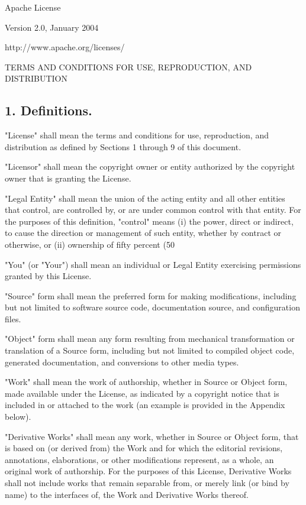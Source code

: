 Apache License

Version 2.0, January 2004

http://www.apache.org/licenses/

TERMS AND CONDITIONS FOR USE, REPRODUCTION, AND DISTRIBUTION

\subsection {1. Definitions.}
"License" shall mean the terms and conditions for use, reproduction, and distribution as defined by Sections 1 through 9 of this document.

"Licensor" shall mean the copyright owner or entity authorized by the copyright owner that is granting the License.

"Legal Entity" shall mean the union of the acting entity and all other entities that control, are controlled by, or are under common control with that entity. For the purposes of this definition, "control" means (i) the power, direct or indirect, to cause the direction or management of such entity, whether by contract or otherwise, or (ii) ownership of fifty percent (50%

"You" (or "Your") shall mean an individual or Legal Entity exercising permissions granted by this License.

"Source" form shall mean the preferred form for making modifications, including but not limited to software source code, documentation source, and configuration files.

"Object" form shall mean any form resulting from mechanical transformation or translation of a Source form, including but not limited to compiled object code, generated documentation, and conversions to other media types.

"Work" shall mean the work of authorship, whether in Source or Object form, made available under the License, as indicated by a copyright notice that is included in or attached to the work (an example is provided in the Appendix below).

"Derivative Works" shall mean any work, whether in Source or Object form, that is based on (or derived from) the Work and for which the editorial revisions, annotations, elaborations, or other modifications represent, as a whole, an original work of authorship. For the purposes of this License, Derivative Works shall not include works that remain separable from, or merely link (or bind by name) to the interfaces of, the Work and Derivative Works thereof.

